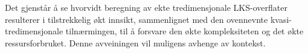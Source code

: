 Det gjenstår å se hvorvidt beregning av ekte tredimensjonale LKS-overflater
resulterer i tilstrekkelig økt innsikt, sammenlignet med den ovennevnte
kvasi-tredimensjonale tilnærmingen, til å forsvare den økte kompleksiteten og
det økte ressursforbruket. Denne avveiningen vil muligens
avhenge av kontekst.
